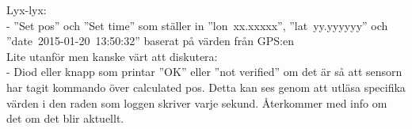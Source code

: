 \documentclass{article}
\begin{document}
	\noindent Lyx-lyx: \\
	-	”Set pos” och ”Set time” som ställer in \hbox{''lon xx.xxxxx''}, \hbox{''lat yy.yyyyyy''} och \hbox{''date 2015-01-20 13:50:32''} baserat på värden från GPS:en \\

	\noindent Lite utanför men kanske värt att diskutera: \\
-	Diod eller knapp som printar ”OK” eller ”not verified” om det är så att sensorn har tagit kommando över calculated pos. Detta kan ses genom att utläsa specifika värden i den raden som loggen skriver varje sekund. Återkommer med info om det om det blir aktuellt.
	
\end{document}
